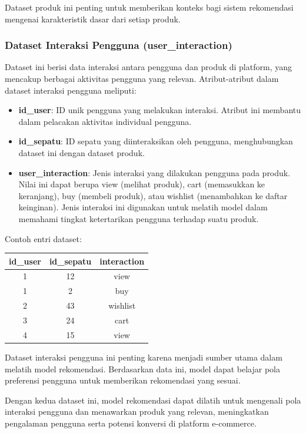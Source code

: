 \documentclass[journal,article,submit,pdftex,moreauthors]{Definitions/mdpi}
\begin{document}
Dataset produk ini penting untuk memberikan konteks bagi sistem rekomendasi mengenai karakteristik dasar dari setiap produk.

\subsubsection{Dataset Interaksi Pengguna (user\_interaction)}
Dataset ini berisi data interaksi antara pengguna dan produk di platform, yang mencakup berbagai aktivitas pengguna yang relevan. Atribut-atribut dalam dataset interaksi pengguna meliputi:

\begin{itemize}
    \item \textbf{id\_user}: ID unik pengguna yang melakukan interaksi. Atribut ini membantu dalam pelacakan aktivitas individual pengguna.
    \item \textbf{id\_sepatu}: ID sepatu yang diinteraksikan oleh pengguna, menghubungkan dataset ini dengan dataset produk.
    \item \textbf{user_interaction}: Jenis interaksi yang dilakukan pengguna pada produk. Nilai ini dapat berupa view (melihat produk), cart (memasukkan ke keranjang), buy (membeli produk), atau wishlist (menambahkan ke daftar keinginan). Jenis interaksi ini digunakan untuk melatih model dalam memahami tingkat ketertarikan pengguna terhadap suatu produk.
\end{itemize}

Contoh entri dataset:

\begin{table}[h]
\centering
\begin{tabular}{|c|c|c|}
\hline
\textbf{id\_user} & \textbf{id\_sepatu} & \textbf{interaction} \\ \hline
1 & 12 & view \\ \hline
1 & 2 & buy \\ \hline
2 & 43 & wishlist \\ \hline
3 & 24 & cart \\ \hline
4 & 15 & view \\ \hline
\end{tabular}
\end{table}

Dataset interaksi pengguna ini penting karena menjadi sumber utama dalam melatih model rekomendasi. Berdasarkan data ini, model dapat belajar pola preferensi pengguna untuk memberikan rekomendasi yang sesuai.

Dengan kedua dataset ini, model rekomendasi dapat dilatih untuk mengenali pola interaksi pengguna dan menawarkan produk yang relevan, meningkatkan pengalaman pengguna serta potensi konversi di platform e-commerce.
\end{document}
